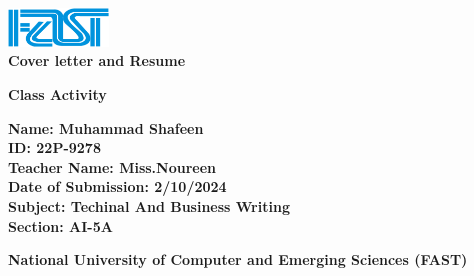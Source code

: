 \documentclass[12pt]{article}
\begin{document}
\begin{titlepage}
    \centering
    
    \vspace*{2cm}
    \includegraphics[width=0.2\textwidth]{1.png} \\[2cm] %
    
    {\Huge \textbf{ Cover letter and Resume } } \\ \vspace{1cm}
    
{\LARGE \textbf{Class Activity}}    
    \begin{flushleft}
        \vspace{1cm}
        
        \LARGE \textbf{ Name: Muhammad Shafeen } \\ \vspace{1cm}
        \LARGE \textbf{ ID: 22P-9278  }  \\ \vspace{1cm}
        \LARGE \textbf{ Teacher Name: Miss.Noureen}  \\ \vspace{1cm}
        \LARGE \textbf{ Date of Submission: 2/10/2024} \\ \vspace{1cm}
        \LARGE \textbf{ Subject: Techinal And Business Writing} \\ \vspace{1cm}
        \LARGE \textbf{ Section: AI-5A} \\ \vspace{1cm}
    \end{flushleft}
    
    \vfill 
    \Large \textbf{National University of Computer and Emerging Sciences (FAST)} 

    \vspace{1cm}

\end{titlepage}
\end{document}
